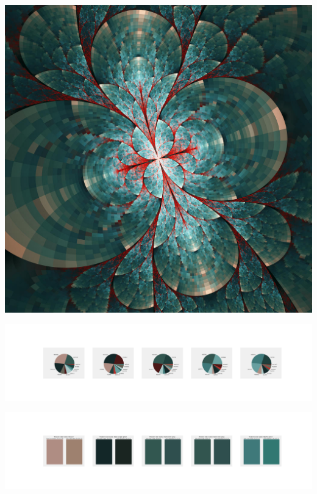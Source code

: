 \documentclass[11pt]{article}
\begin{document}
\begin{landscape}
    \begin{center}
    \includegraphics[width=\textwidth]{./nbimg/file (269).jpg}
    \end{center}

    \begin{center}
    \includegraphics[width=250mm]{./nbimg/pie-188.jpg}
    \end{center}

    \begin{center}
    \includegraphics[width=250mm]{./nbimg/peak-188.jpg}
    \end{center}
    


\end{landscape}
\end{document}
